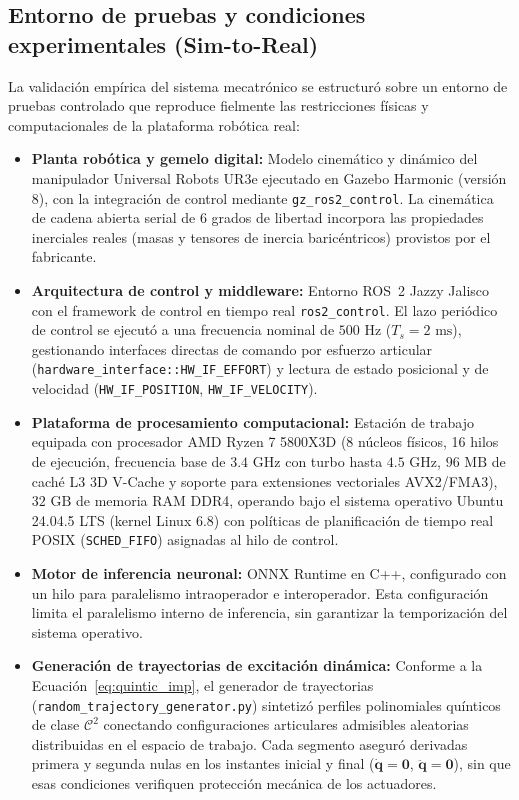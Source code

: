 \documentclass[12pt]{article}
\begin{document}
\subsection{Entorno de pruebas y condiciones experimentales (Sim-to-Real)}
\label{sec:entorno_pruebas}

La validación empírica del sistema mecatrónico se estructuró sobre un entorno de pruebas controlado que reproduce fielmente las restricciones físicas y computacionales de la plataforma robótica real:

\begin{itemize}
    \item \textbf{Planta robótica y gemelo digital:} Modelo cinemático y dinámico del manipulador Universal Robots UR3e ejecutado en Gazebo Harmonic (versión 8), con la integración de control mediante \texttt{gz\_ros2\_control}. La cinemática de cadena abierta serial de 6 grados de libertad incorpora las propiedades inerciales reales (masas y tensores de inercia baricéntricos) provistos por el fabricante.
    \item \textbf{Arquitectura de control y middleware:} Entorno ROS~2 Jazzy Jalisco con el framework de control en tiempo real \texttt{ros2\_control}. El lazo periódico de control se ejecutó a una frecuencia nominal de $500\text{ Hz}$ ($T_s = 2\text{ ms}$), gestionando interfaces directas de comando por esfuerzo articular (\texttt{hardware\_interface::HW\_IF\_EFFORT}) y lectura de estado posicional y de velocidad (\texttt{HW\_IF\_POSITION}, \texttt{HW\_IF\_VELOCITY}).
    \item \textbf{Plataforma de procesamiento computacional:} Estación de trabajo equipada con procesador AMD Ryzen 7 5800X3D (8 núcleos físicos, 16 hilos de ejecución, frecuencia base de $3.4\text{ GHz}$ con turbo hasta $4.5\text{ GHz}$, $96\text{ MB}$ de caché L3 3D V-Cache y soporte para extensiones vectoriales AVX2/FMA3), $32\text{ GB}$ de memoria RAM DDR4, operando bajo el sistema operativo Ubuntu 24.04.5 LTS (kernel Linux 6.8) con políticas de planificación de tiempo real POSIX (\texttt{SCHED\_FIFO}) asignadas al hilo de control.
    \item \textbf{Motor de inferencia neuronal:} ONNX Runtime en C++, configurado con un hilo para paralelismo intraoperador e interoperador. Esta configuración limita el paralelismo interno de inferencia, sin garantizar la temporización del sistema operativo.
    \item \textbf{Generación de trayectorias de excitación dinámica:} Conforme a la Ecuación~\eqref{eq:quintic_imp}, el generador de trayectorias (\texttt{random\_trajectory\_generator.py}) sintetizó perfiles polinomiales quínticos de clase $\mathcal{C}^2$ conectando configuraciones articulares admisibles aleatorias distribuidas en el espacio de trabajo. Cada segmento aseguró derivadas primera y segunda nulas en los instantes inicial y final ($\dot{\bm{q}} = \bm{0}$, $\ddot{\bm{q}} = \bm{0}$), sin que esas condiciones verifiquen protección mecánica de los actuadores.

\end{itemize}
\end{document}
